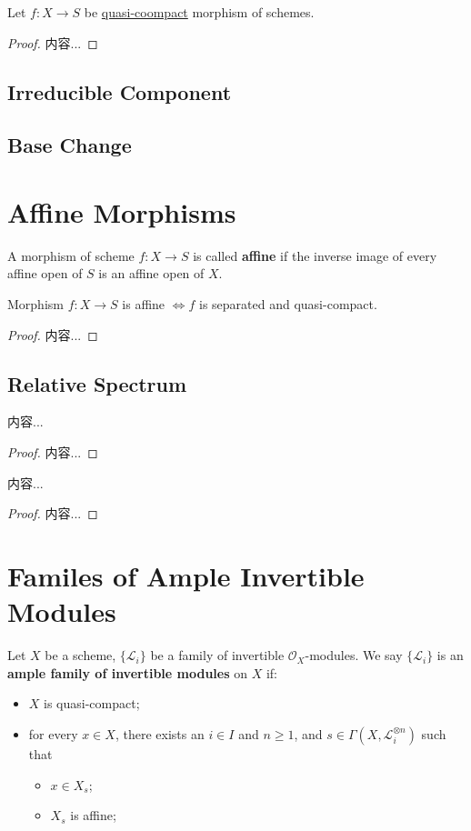\documentclass[Total.tex]{subfiles}
\begin{document}
			\begin{lemma}
				Let $f:X\rightarrow S$ be \underline{quasi-coompact} morphism of schemes.
			\end{lemma}
			\begin{proof}
				内容...
			\end{proof}
			
			\subsection{Irreducible Component}
			\subsection{Base Change}
		\section{Affine Morphisms}
			\begin{Def}
				A morphism of scheme $f:X\rightarrow S$ is called \textbf{affine} if the inverse image of every affine open of $S$ is an affine open of $X$.
			\end{Def}
			\begin{lemma}
				Morphism $f:X\rightarrow S$ is affine $\Leftrightarrow f$ is separated and quasi-compact.
			\end{lemma}
			\begin{proof}
				内容...
			\end{proof}
			\subsection{Relative Spectrum}
				\begin{lemma}
					内容...
				\end{lemma}
				\begin{proof}
					内容...
				\end{proof}
				\begin{lemma}
					内容...
				\end{lemma}
				\begin{proof}
					内容...
				\end{proof}
		\section{Familes of Ample Invertible Modules}
			\begin{Def}
				Let $X$ be a scheme, $\{\mathcal{L}_i\}$ be a family of invertible $\mathcal{O}_X$-modules. We say $\{\mathcal{L}_i\}$ is an \textbf{ample family of invertible modules} on $X$ if:
				\begin{itemize}
					\item $X$ is quasi-compact;
					\item for every $x\in X$, there exists an $i\in I$ and $n\geq 1$, and $s\in \Gamma(X,\mathcal{L}_i^{\otimes n})$ such that
					\begin{itemize}
						\item $x\in X_s$;
						\item $X_s$ is affine;
					\end{itemize}
				\end{itemize}
			\end{Def}
\end{document}
